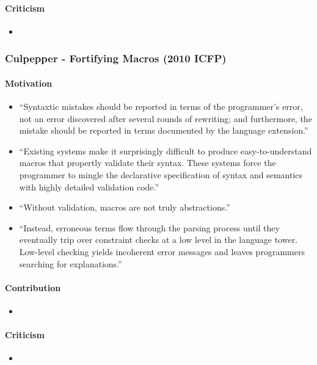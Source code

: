 \documentclass[12pt]{article}	%
\begin{document}
\paragraph{Criticism}
\begin{itemize}
	\item
\end{itemize}


\subsubsection*{Culpepper - Fortifying Macros (2010 ICFP)}
\paragraph{Motivation}
\begin{itemize}
	\item ``Syntaxtic mistakes should be reported in terms of the programmer's error, not an error discovered after several rounds of rewriting; and furthermore, the mistake should be reported in terms documented by the language extension.''~\cite[p1]{Culpepper2010Fortifying}
	\item ``Existing systems make it surprisingly difficult to produce easy-to-understand macros that propertly validate their syntax. These systems force the programmer to mingle the declarative specification of syntax and semantics with highly detailed validation code.''~\cite{Culpepper2010Fortifying}
	\item ``Without validation, macros are not truly abstractions.''~\cite{Culpepper2010Fortifying}
	\item ``Instead, erroneous terms flow through the parsing process until they eventually trip over constraint checks at a low level in the language tower. Low-level checking yields incoherent error messages and leaves programmers searching for explanations.''~\cite{Culpepper2010Fortifying}
\end{itemize}
\paragraph{Contribution}
\begin{itemize}
	\item
\end{itemize}
\paragraph{Criticism}
\begin{itemize}
	\item
\end{itemize}
\end{document}

